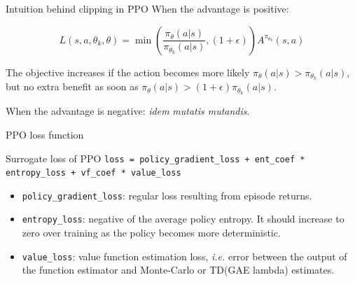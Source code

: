 \documentclass[10pt, aspectratio=1610]{beamer}
\begin{document}

\begin{frame}{Intuition behind clipping in PPO}
    When the advantage is positive:

    $$L(s,a,\theta_k,\theta) = \min\left( \frac{\pi_{\theta}(a|s)}{\pi_{\theta_k}(a|s)}, (1 + \epsilon) \right) A^{\pi_{\theta_k}}(s,a)$$

    The objective increases if the action becomes more likely $\pi_{\theta}(a|s) > \pi_{\theta_k}(a|s)$, but no extra benefit as soon as $ \pi_{\theta}(a|s) > (1+\epsilon) \pi_{\theta_k}(a|s)$.

    When the advantage is negative: \emph{idem} \emph{mutatis mutandis}.
\end{frame}

\begin{frame}[fragile]{PPO loss function}
    \begin{block}{Surrogate loss of PPO}
        \texttt{loss = policy_gradient_loss + ent_coef * entropy_loss + vf_coef * value_loss}
    \end{block}
    \begin{itemize}
        \item \texttt{policy_gradient_loss}: regular loss resulting from episode returns.
        \item \texttt{entropy_loss}: negative of the average policy entropy. It should increase to zero over training as the policy becomes more deterministic.
        \item \texttt{value_loss}: value function estimation loss, \emph{i.e.} error between the output of the function estimator and Monte-Carlo or TD(GAE lambda) estimates.
    \end{itemize}
\end{frame}
\end{document}
